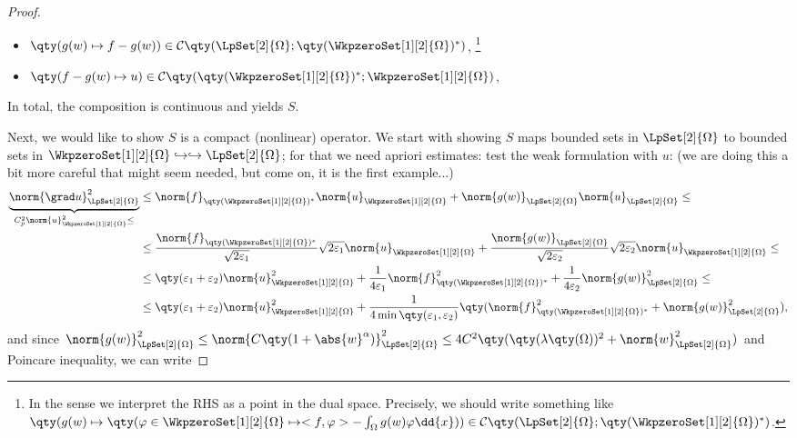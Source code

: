 \begin{example}
\begin{proof}
\begin{itemize}
			\item $\qty(g(w) \mapsto f - g(w))  \in \mathcal{C}\qty(\LpSet[2]{\Omega}; \qty(\WkpzeroSet[1][2]{\Omega})^{*})$, \footnote{In the sense we interpret the RHS as a point in the dual space. Precisely, we should write something like $\qty(g(w) \mapsto \qty(\varphi \in \WkpzeroSet[1][2]{\Omega} \mapsto <f,\varphi>-\int_{\Omega}g(w) \varphi\dd{x})) \in \mathcal{C}\qty(\LpSet[2]{\Omega}; \qty(\WkpzeroSet[1][2]{\Omega})^{*})$.} 
			\item $\qty(f - g(w) \mapsto u) \in \mathcal{C}\qty(\qty(\WkpzeroSet[1][2]{\Omega})^{*}; \WkpzeroSet[1][2]{\Omega})$, 
		\end{itemize}
		In total, the composition is continuous and yields $S$.

		Next, we would like to show $S$ is a compact (nonlinear) operator. We start with showing $S$ maps bounded sets in $\LpSet[2]{\Omega}$ to bounded sets in $\WkpzeroSet[1][2]{\Omega} \hookrightarrow \hookrightarrow \LpSet[2]{\Omega}$; for that we need apriori estimates: test the weak formulation with $u$: (we are doing this a bit more careful that might seem needed, but come on, it is the first example...)
\begin{align*}
	\underbrace{\norm{\grad u}_{\LpSet[2]{\Omega}}^{2}}_{C_p^{2} \norm{u}_{\WkpzeroSet[1][2]{\Omega}}^{2} \leq} &\leq\norm{f}_{\qty(\WkpzeroSet[1][2]{\Omega})^{*}}\norm{u}_{\WkpzeroSet[1][2]{\Omega}} + \norm{g(w)}_{\LpSet[2]{\Omega}} \norm{u}_{\LpSet[2]{\Omega}}\leq \\
														    &\leq \frac{\norm{f}_{\qty(\WkpzeroSet[1][2]{\Omega})^{*}}}{\sqrt{2 \varepsilon_1}}\sqrt{2 \varepsilon_1}\norm{u}_{\WkpzeroSet[1][2]{\Omega}} + \frac{\norm{g(w)}_{\LpSet[2]{\Omega}}}{\sqrt{2 \varepsilon_2}} \sqrt{2 \varepsilon_2}\norm{u}_{\WkpzeroSet[1][2]{\Omega}}\leq   \\
														    &\leq \qty(\varepsilon_1 + \varepsilon_2)\norm{u}_{\WkpzeroSet[1][2]{\Omega}}^{2} + \frac{1}{4 \varepsilon_1} \norm{f}_{\qty(\WkpzeroSet[1][2]{\Omega})^{*}}^{2} + \frac{1}{4 \varepsilon_2} \norm{g(w)}_{\LpSet[2]{\Omega}}^{2} \leq \\
														    &\leq \qty(\varepsilon_1 + \varepsilon_2)\norm{u}_{\WkpzeroSet[1][2]{\Omega}}^{2}+ \frac{1}{4\min\qty(\varepsilon_1, \varepsilon_2)}\qty(\norm{f}_{\qty(\WkpzeroSet[1][2]{\Omega})^{*}}^{2}+ \norm{g(w)}_{\LpSet[2]{\Omega}}^{2}),
\end{align*}
and since $\norm{g(w)}_{\LpSet[2]{\Omega}}^{2} \leq \norm{C\qty(1+\abs{w}^{\alpha})}_{\LpSet[2]{\Omega}}^{2} \leq 4C^{2}\qty(\qty(\lambda\qty(\Omega))^{2}+\norm{w}_{\LpSet[2]{\Omega}}^{2}) $ and Poincare inequality, we can write

\end{proof}
\end{example}
